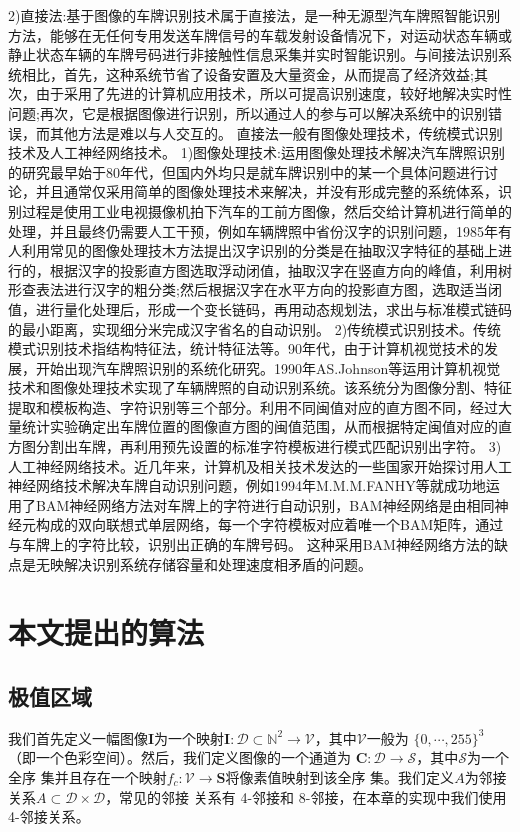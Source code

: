 \documentclass[UTF8]{article}
\begin{document}
2)直接法:基于图像的车牌识别技术属于直接法，是一种无源型汽车牌照智能识别方法，能够在无任何专用发送车牌信号的车载发射设备情况下，对运动状态车辆或静止状态车辆的车牌号码进行非接触性信息采集并实时智能识别。与间接法识别系统相比，首先，这种系统节省了设备安置及大量资金，从而提高了经济效益;其次，由于采用了先进的计算机应用技术，所以可提高识别速度，较好地解决实时性问题;再次，它是根据图像进行识别，所以通过人的参与可以解决系统中的识别错误，而其他方法是难以与人交互的。
直接法一般有图像处理技术，传统模式识别技术及人工神经网络技术。
1)图像处理技术:运用图像处理技术解决汽车牌照识别的研究最早始于80年代，但国内外均只是就车牌识别中的某一个具体问题进行讨论，并且通常仅采用简单的图像处理技术来解决，并没有形成完整的系统体系，识别过程是使用工业电视摄像机拍下汽车的工前方图像，然后交给计算机进行简单的处理，并且最终仍需要人工干预，例如车辆牌照中省份汉字的识别问题，1985年有人利用常见的图像处理技木方法提出汉字识别的分类是在抽取汉字特征的基础上进行的，根据汉字的投影直方图选取浮动闭值，抽取汉字在竖直方向的峰值，利用树形查表法进行汉字的粗分类;然后根据汉字在水平方向的投影直方图，选取适当闭值，进行量化处理后，形成一个变长链码，再用动态规划法，求出与标准模式链码的最小距离，实现细分米完成汉字省名的自动识别。
2)传统模式识别技术。传统模式识别技术指结构特征法，统计特征法等。90年代，由于计算机视觉技术的发展，开始出现汽车牌照识别的系统化研究。1990年AS.Johnson等运用计算机视觉技术和图像处理技术实现了车辆牌照的自动识别系统。该系统分为图像分割、特征提取和模板构造、字符识别等三个部分。利用不同闽值对应的直方图不同，经过大量统计实验确定出车牌位置的图像直方图的闽值范围，从而根据特定闽值对应的直方图分割出车牌，再利用预先设置的标准字符模板进行模式匹配识别出字符。
3)人工神经网络技术。近几年来，计算机及相关技术发达的一些国家开始探讨用人工神经网络技术解决车牌自动识别问题，例如1994年M.M.M.FANHY等就成功地运用了BAM神经网络方法对车牌上的字符进行自动识别，BAM神经网络是由相同神经元构成的双向联想式单层网络，每一个字符模板对应着唯一个BAM矩阵，通过与车牌上的字符比较，识别出正确的车牌号码。
这种采用BAM神经网络方法的缺点是无映解决识别系统存储容量和处理速度相矛盾的问题。

\section{本文提出的算法}

\subsection{极值区域}

我们首先定义一幅图像$\mathbf{I}$为一个映射$\mathbf{I} : \mathcal{D} \subset
\mathbb{N}^2 \rightarrow \mathcal{V}$，其中$\mathcal{V}$一般为
$\{0,\cdots,255\}^3$（即一个色彩空间）。然后，我们定义图像的一个通道为
$\mathbf{C} : \mathcal{D} \rightarrow \mathcal{S}$，其中$\mathcal{S}$为一个全序
集并且存在一个映射$f_c : \mathcal{V} \rightarrow \mathbf{S}$将像素值映射到该全序
集。我们定义$A$为邻接关系$A \subset \mathcal{D} \times \mathcal{D}$，常见的邻接
关系有 4-邻接和 8-邻接，在本章的实现中我们使用 4-邻接关系。
\end{document}
